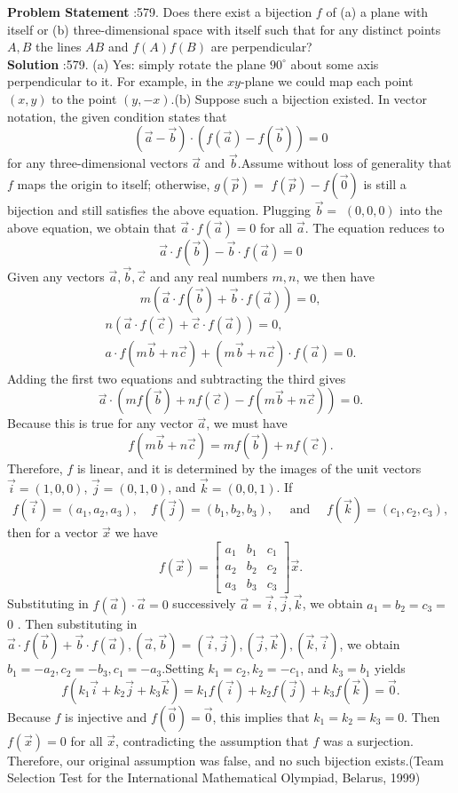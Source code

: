 \documentclass[10pt]{article}
\begin{document}
\textbf{Problem Statement} :579. Does there exist a bijection $f$ of (a) a plane with itself or (b) three-dimensional space with itself such that for any distinct points $A, B$ the lines $A B$ and $f(A) f(B)$ are perpendicular?\\
\textbf{Solution} :579. (a) Yes: simply rotate the plane $90^{\circ}$ about some axis perpendicular to it. For example, in the $x y$-plane we could map each point $(x, y)$ to the point $(y,-x)$.(b) Suppose such a bijection existed. In vector notation, the given condition states that$$ (\vec{a}-\vec{b}) \cdot(f(\vec{a})-f(\vec{b}))=0 $$for any three-dimensional vectors $\vec{a}$ and $\vec{b}$.Assume without loss of generality that $f$ maps the origin to itself; otherwise, $g(\vec{p})=$ $f(\vec{p})-f(\overrightarrow{0})$ is still a bijection and still satisfies the above equation. Plugging $\vec{b}=$ $(0,0,0)$ into the above equation, we obtain that $\vec{a} \cdot f(\vec{a})=0$ for all $\vec{a}$. The equation reduces to$$ \vec{a} \cdot f(\vec{b})-\vec{b} \cdot f(\vec{a})=0 $$Given any vectors $\vec{a}, \vec{b}, \vec{c}$ and any real numbers $m, n$, we then have$$ m(\vec{a} \cdot f(\vec{b})+\vec{b} \cdot f(\vec{a}))=0, $$$$ \begin{array}{r} n(\vec{a} \cdot f(\vec{c})+\vec{c} \cdot f(\vec{a}))=0, \\ a \cdot f(m \vec{b}+n \vec{c})+(m \vec{b}+n \vec{c}) \cdot f(\vec{a})=0 . \end{array} $$Adding the first two equations and subtracting the third gives$$ \vec{a} \cdot(m f(\vec{b})+n f(\vec{c})-f(m \vec{b}+n \vec{c}))=0 . $$Because this is true for any vector $\vec{a}$, we must have$$ f(m \vec{b}+n \vec{c})=m f(\vec{b})+n f(\vec{c}) . $$Therefore, $f$ is linear, and it is determined by the images of the unit vectors $\vec{i}=(1,0,0)$, $\vec{j}=(0,1,0)$, and $\vec{k}=(0,0,1)$. If$$ f(\vec{i})=\left(a_{1}, a_{2}, a_{3}\right), \quad f(\vec{j})=\left(b_{1}, b_{2}, b_{3}\right), \quad \text { and } \quad f(\vec{k})=\left(c_{1}, c_{2}, c_{3}\right), $$then for a vector $\vec{x}$ we have$$ f(\vec{x})=\left[\begin{array}{lll} a_{1} & b_{1} & c_{1} \\ a_{2} & b_{2} & c_{2} \\ a_{3} & b_{3} & c_{3} \end{array}\right] \vec{x} . $$Substituting in $f(\vec{a}) \cdot \vec{a}=0$ successively $\vec{a}=\vec{i}, \vec{j}, \vec{k}$, we obtain $a_{1}=b_{2}=c_{3}=$ 0 . Then substituting in $\vec{a} \cdot f(\vec{b})+\vec{b} \cdot f(\vec{a}),(\vec{a}, \vec{b})=(\vec{i}, \vec{j}),(\vec{j}, \vec{k}),(\vec{k}, \vec{i})$, we obtain $b_{1}=-a_{2}, c_{2}=-b_{3}, c_{1}=-a_{3}$.Setting $k_{1}=c_{2}, k_{2}=-c_{1}$, and $k_{3}=b_{1}$ yields$$ f\left(k_{1} \vec{i}+k_{2} \vec{j}+k_{3} \vec{k}\right)=k_{1} f(\vec{i})+k_{2} f(\vec{j})+k_{3} f(\vec{k})=\overrightarrow{0} . $$Because $f$ is injective and $f(\overrightarrow{0})=\overrightarrow{0}$, this implies that $k_{1}=k_{2}=k_{3}=0$. Then $f(\vec{x})=0$ for all $\vec{x}$, contradicting the assumption that $f$ was a surjection. Therefore, our original assumption was false, and no such bijection exists.(Team Selection Test for the International Mathematical Olympiad, Belarus, 1999)\\
\end{document}
